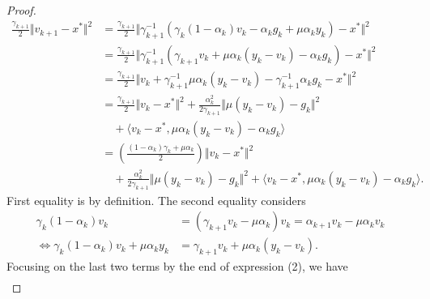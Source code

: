 \documentclass[12pt]{article}
\begin{document}
\begin{proof}
\begin{align*}
            \frac{\gamma_{k + 1}}{2}\Vert v_{k + 1} - x^* \Vert^2
            &= 
            \frac{\gamma_{k + 1}}{2}\Vert 
                \gamma_{k + 1}^{-1}
                (
                    \gamma_k(1 - \alpha_k)v_k - 
                    \alpha_k g_k + \mu \alpha_k y_k
                )
                - x^* 
            \Vert^2
            \\
            &=  
            \frac{\gamma_{k + 1}}{2}
            \Vert 
                \gamma_{k + 1}^{-1}
                (
                \gamma_{k + 1} v_k + \mu \alpha_k(y_k - v_k)
                    - \alpha_k g_k
                )
                - x^* 
            \Vert^2
            \\
            &= 
            \frac{\gamma_{k + 1}}{2}
            \Vert 
                v_k + \gamma_{k + 1}^{-1} \mu \alpha_k (y_k - v_k)
                - \gamma_{k + 1}^{-1}\alpha_k g_k
                - x^* 
            \Vert^2
            \\
            &= 
            \frac{\gamma_{k + 1}}{2}
            \Vert v_k - x^*\Vert^2 
            + 
            \frac{\alpha_k^2}{2\gamma_{k + 1}}\Vert \mu(y_k - v_k) - g_k\Vert^2 
            \\ &\quad 
                + 
                \langle v_k - x^*, \mu \alpha_k(y_k - v_k) - \alpha_k g_k\rangle
            \\
            &= 
            \left(
            \frac{(1 - \alpha_k)\gamma_k + \mu \alpha_k}{2} 
            \right)\Vert v_k - x^*\Vert^2
            \\ &\quad
                + 
                \frac{\alpha_k^2}{2\gamma_{k + 1}}
                \Vert \mu(y_k - v_k) - g_k\Vert^2 
                + 
                \langle v_k - x^*, \mu \alpha_k(y_k - v_k) - \alpha_k g_k\rangle. 
        \tag{2*}
        \end{align*}
        First equality is by definition. 
        The second equality considers 
        \begin{align*}
            \gamma_k(1 - \alpha_k) v_k &= 
            (\gamma_{k + 1} v_k - \mu \alpha_k)v_k
            = \alpha_{k + 1} v_k - \mu\alpha_k v_k
            \\
            \iff 
            \gamma_k(1 - \alpha_k) v_k + \mu \alpha_k y_k
            &= 
            \gamma_{k + 1} v_k + \mu \alpha_k(y_k - v_k). 
        \end{align*}
        Focusing on the last two terms by the end of expression (2), we have  
        {\small
        \begin{align*}

\end{align*}}
\end{proof}
\end{document}
